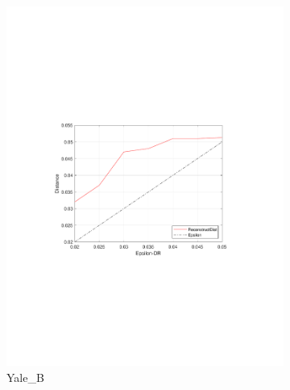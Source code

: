 \begin{figure}[ht!]
\begin{subfigure}{.33\textwidth}
		\includegraphics[width=\linewidth, trim=3.8cm 8cm 4cm 8cm, clip=true]{figures/ep_yale}
		\captionsetup{justification=centering}
		\caption{Yale\_B}
		\label{fig:yale_dist}
	\end{subfigure}
	\begin{subfigure}{.33\textwidth}

\end{subfigure}
\end{figure}
